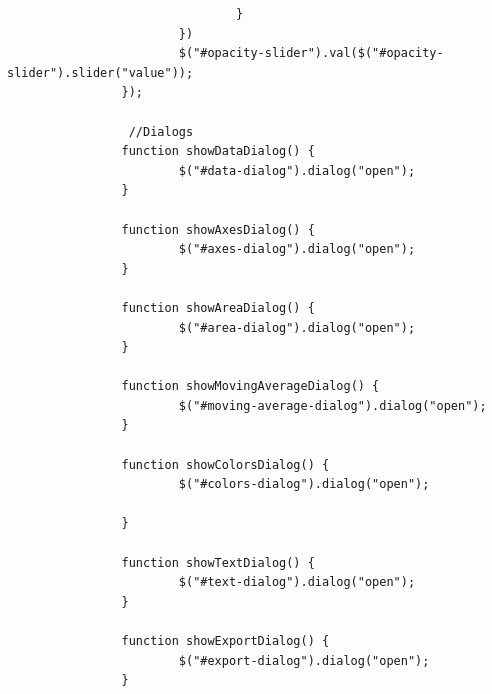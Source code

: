 \begin{lstlisting}
                                }
                        })
                        $("#opacity-slider").val($("#opacity-slider").slider("value"));
                });

                 //Dialogs
                function showDataDialog() {
                        $("#data-dialog").dialog("open");
                }

                function showAxesDialog() {
                        $("#axes-dialog").dialog("open");
                }

                function showAreaDialog() {
                        $("#area-dialog").dialog("open");
                }

                function showMovingAverageDialog() {
                        $("#moving-average-dialog").dialog("open");
                }

                function showColorsDialog() {
                        $("#colors-dialog").dialog("open");

                }

                function showTextDialog() {
                        $("#text-dialog").dialog("open");
                }

                function showExportDialog() {
                        $("#export-dialog").dialog("open");
                }


\end{lstlisting}
